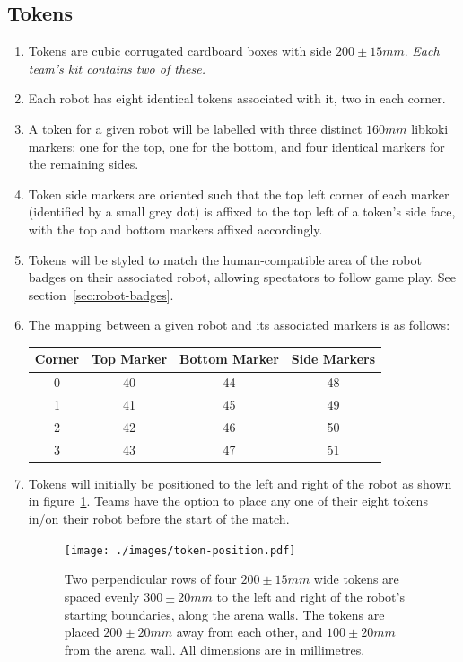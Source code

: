 \subsection{Tokens}
\label{sub:Tokens}
\begin{enumerate}
\item Tokens are cubic corrugated cardboard boxes with side $200 \pm 15 mm$.
      \emph{Each team's kit contains two of these.}

\item Each robot has eight identical tokens associated with it, two in each corner.

\item A token for a given robot will be labelled with three distinct $160mm$ libkoki markers: one for the top, one for the bottom, and four identical markers for the remaining sides.

\item Token side markers are oriented such that the top left corner of each marker (identified by a small grey dot) is affixed to the top left of a token's side face, with the top and bottom markers affixed accordingly.

\item Tokens will be styled to match the human-compatible area of the robot badges on their associated robot, allowing spectators to follow game play.
      See section~\ref{sec:robot-badges}.

\item The mapping between a given robot and its associated markers is as follows:

\begin{center}
  \begin{tabular}{cccc}
    \toprule
    \textbf{Corner} & \textbf{Top Marker} & \textbf{Bottom Marker} & \textbf{Side Markers} \\
    \midrule
    0 & 40 & 44 & 48 \\
    1 & 41 & 45 & 49 \\
    2 & 42 & 46 & 50 \\
    3 & 43 & 47 & 51 \\
    \bottomrule
  \end{tabular}
\end{center}

\item Tokens will initially be positioned to the left and right of the robot as shown in figure~\ref{fig:token-position}.
      Teams have the option to place any one of their eight tokens in/on their robot before the start of the match.

\begin{figure}
  \centering
  \texttt{[image: ./images/token-position.pdf]}
  \caption{Two perpendicular rows of four $200 \pm 15mm$ wide tokens are spaced evenly $300 \pm 20mm$ to the left and right of the robot's starting boundaries, along the arena walls.
    The tokens are placed $200 \pm 20mm$ away from each other, and $100 \pm 20mm$ from the arena wall.
           All dimensions are in millimetres.}
  \label{fig:token-position}
\end{figure}

\end{enumerate}

\clearpage
